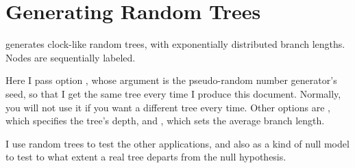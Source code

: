\section[sct_gen]{Generating Random Trees}


\gen{} generates clock-like random trees, with exponentially distributed branch
lengths. Nodes are sequentially labeled.


Here I pass option , whose argument is the pseudo-random
number generator's seed, so that I get the same tree every time I produce this
document. Normally, you will not use it if you want a different tree every time.
Other options are , which specifies the tree's depth, and
, which sets the average branch length.

I use random trees to test the other applications, and also as a kind of null
model to test to what extent a real tree departs from the null hypothesis.
